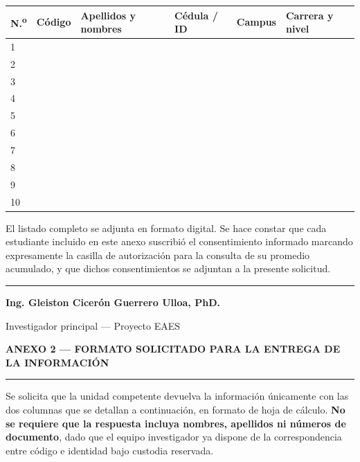 \documentclass[11pt,a4paper]{article}
\newcommand{\campo}[1]{\rule{#1}{0.4pt}}
\begin{document}
\begin{table}[htbp]
	\centering
	\footnotesize
	\begin{tabular}{C{0.9cm} C{1.9cm} L{3.4cm} L{2.5cm} C{1.9cm} L{2.6cm}}
		\toprule
		\textbf{N.\textsuperscript{o}} & \textbf{C\'odigo} & \textbf{Apellidos y nombres} & \textbf{C\'edula / ID} & \textbf{Campus} & \textbf{Carrera y nivel} \\
		 & & & & & \\
		2 & & & & & \\
		3 & & & & & \\
		4 & & & & & \\
		5 & & & & & \\
		6 & & & & & \\
		7 & & & & & \\
		8 & & & & & \\
		9 & & & & & \\
		10 & & & & & \\
		\bottomrule
	\end{tabular}
\end{table}

{\footnotesize El listado completo se adjunta en formato digital. Se hace constar que cada estudiante incluido en este anexo suscribi\'o el consentimiento informado marcando expresamente la casilla de autorizaci\'on para la consulta de su promedio acumulado, y que dichos consentimientos se adjuntan a la presente solicitud.}

\vspace{20pt}
\campo{7.6cm}

\textbf{Ing. Gleiston Cicer\'on Guerrero Ulloa, PhD.}

{\small Investigador principal --- Proyecto EAES}

\clearpage

\begin{center}
	{\sffamily\normalsize\bfseries\color{azulinstitucional} ANEXO 2 --- FORMATO SOLICITADO PARA LA ENTREGA DE LA INFORMACI\'ON\par}
\end{center}

\vspace{6pt}
\hrule
\vspace{8pt}

Se solicita que la unidad competente devuelva la informaci\'on \'unicamente con las dos columnas que se detallan a continuaci\'on, en formato de hoja de c\'alculo. \textbf{No se requiere que la respuesta incluya nombres, apellidos ni n\'umeros de documento}, dado que el equipo investigador ya dispone de la correspondencia entre c\'odigo e identidad bajo custodia reservada.
\end{document}
